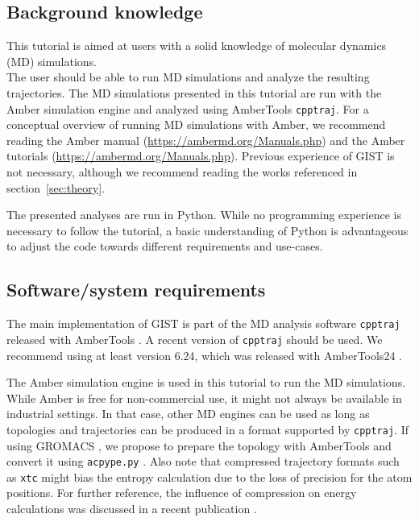 \documentclass[9pt,tutorial]{livecoms}
\newcommand{\software}{\texttt}
\newcommand\inlinecode{\texttt}
\begin{document}
\subsection{Background knowledge}
This tutorial is aimed at users with a solid knowledge of molecular dynamics (MD) simulations.\\
The user should be able to run MD simulations and analyze the resulting trajectories. 
The MD simulations presented in this tutorial are run with the Amber simulation engine and analyzed using AmberTools \software{cpptraj}. 
For a conceptual overview of running MD simulations with Amber, we recommend reading the Amber manual (\url{https://ambermd.org/Manuals.php}) \cite{amber24} and the Amber tutorials (\url{https://ambermd.org/Manuals.php}). 
Previous experience of GIST is not necessary, although we recommend reading the works referenced in section~\ref{sec:theory}.

The presented analyses are run in Python.
While no programming experience is necessary to follow the tutorial, a basic understanding of Python is advantageous to adjust the code towards different requirements and use-cases.

\subsection{Software/system requirements}
The main implementation of GIST is part of the MD analysis software \software{cpptraj} released with AmberTools \cite{amber24, Case2023-ambertools}.
A recent version of \software{cpptraj} should be used. We recommend using at least version 6.24, which was released with AmberTools24 \cite{Case2023-ambertools}.

The Amber simulation engine is used in this tutorial to run the MD simulations.
While Amber is free for non-commercial use, it might not always be available in industrial settings.
In that case, other MD engines can be used as long as topologies and trajectories can be produced in a format supported by \software{cpptraj}.
If using GROMACS \cite{Abraham2015-gromacs,Pronk2013-gromacs}, we propose to prepare the topology with AmberTools \cite{Case2023-ambertools} and convert it using \software{acpype.py} \cite{Sousa_da_Silva2012-acpype}.
Also note that compressed trajectory formats such as \inlinecode{xtc} might bias the entropy calculation due to the loss of precision for the atom positions. For further reference, the influence of compression on energy calculations was discussed in a recent publication \cite{Roe2022-compression}.
\end{document}
